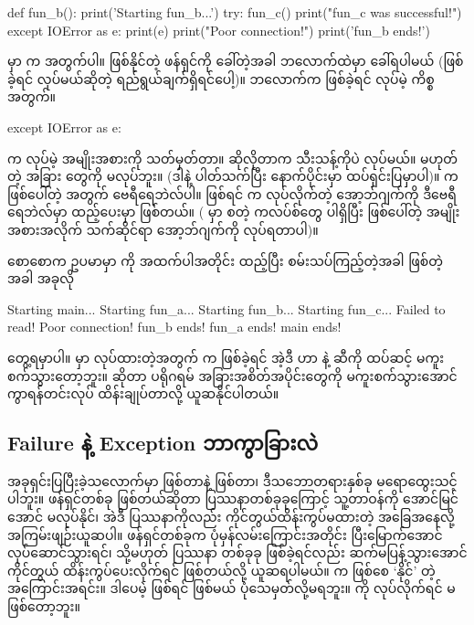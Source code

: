 %
\begin{py}
def fun_b():
    print('Starting fun_b...')
    try:
        fun_c()
        print("fun_c was successful!")
    except IOError as e:
        print(e)
        print("Poor connection!")
    print('fun_b ends!')
\end{py}
%
 မှာ  က  အတွက်ပါ။  ဖြစ်နိုင်တဲ့ ဖန်ရှင်ကို ခေါ်တဲ့အခါ  ဘလောက်ထဲမှာ ခေါ်ရပါမယ် (ဖြစ်ခဲ့ရင်  လုပ်မယ်ဆိုတဲ့ ရည်ရွယ်ချက်ရှိရင်ပေါ့)။  ဘလောက်က  ဖြစ်ခဲ့ရင်  လုပ်မဲ့ ကိစ္စအတွက်။

%
\begin{py}
except IOError as e:
\end{py}
%
 က  လုပ်မဲ့  အမျိုးအစားကို သတ်မှတ်တာ။ ဆိုလိုတာက  သီးသန့်ကိုပဲ  လုပ်မယ်။  မဟုတ်တဲ့ အခြား  တွေကို  မလုပ်ဘူး။ (ဒါနဲ့ ပါတ်သက်ပြီး နောက်ပိုင်းမှာ ထပ်ရှင်းပြမှာပါ)။  က ဖြစ်ပေါ်တဲ့   အတွက် ဗေရီရေဘဲလ်ပါ။  ဖြစ်ရင်  က  လုပ်လိုက်တဲ့  အော့ဘ်ဂျက်ကို ဒီဗေရီရေဘဲလ်မှာ ထည့်ပေးမှာ ဖြစ်တယ်။ ( မှာ \fEn{,} \fEn{,}  စတဲ့ ကလပ်စ်တွေ ပါရှိပြီး ဖြစ်ပေါ်တဲ့  အမျိုးအစားအလိုက် သက်ဆိုင်ရာ  အော့ဘ်ဂျက်ကို  လုပ်ရတာပါ)။

စောစောက ဥပမာမှာ  ကို အထက်ပါအတိုင်း   ထည့်ပြီး စမ်းသပ်ကြည့်တဲ့အခါ  ဖြစ်တဲ့အခါ အခုလို
\begin{codetxt}
Starting main...
Starting fun_a...
Starting fun_b...
Starting fun_c...
Failed to read!
Poor connection!
fun_b ends!
fun_a ends!
main ends!
\end{codetxt}
တွေ့ရမှာပါ။  မှာ  လုပ်ထားတဲ့အတွက်   က  ဖြစ်ခဲ့ရင် အဲ့ဒီ  ဟာ  နဲ့  ဆီကို ထပ်ဆင့် မကူးစက်သွားတော့ဘူး။  ဆိုတာ ပရိုဂရမ် အခြားအစိတ်အပိုင်းတွေကို  မကူးစက်သွားအောင် ကွာရန်တင်းလုပ် ထိန်းချုပ်တာလို့ ယူဆနိုင်ပါတယ်။ 

\subsection*{Failure နဲ့ Exception ဘာကွာခြားလဲ}
အခုရှင်းပြပြီးခဲ့သလောက်မှာ  ဖြစ်တာနဲ့  ဖြစ်တာ၊ ဒီသဘောတရားနှစ်ခု မရောထွေးသင့်ပါဘူး။ ဖန်ရှင်တစ်ခု  ဖြစ်တယ်ဆိုတာ ပြဿနာတစ်ခုခုကြောင့် သူ့တာဝန်ကို အောင်မြင်အောင် မလုပ်နိုင်၊ အဲဒီ ပြဿနာကိုလည်း ကိုင်တွယ်ထိန်းကွပ်မထားတဲ့ အခြေအနေလို့ အကြမ်းဖျဉ်းယူဆပါ။ ဖန်ရှင်တစ်ခုက ပုံမှန်လမ်းကြောင်းအတိုင်း ပြီးမြောက်အောင် လုပ်ဆောင်သွားရင်၊ သို့မဟုတ် ပြဿနာ တစ်ခုခု ဖြစ်ခဲ့ရင်လည်း ဆက်မပြန့်သွားအောင် ကိုင်တွယ် ထိန်းကွပ်ပေးလိုက်ရင်   ဖြစ်တယ်လို့ ယူဆရပါမယ်။  က  ဖြစ်စေ ‘နိုင်’ တဲ့ အကြောင်းအရင်း။ ဒါပေမဲ့  ဖြစ်ရင်  ဖြစ်မယ် ပုံသေမှတ်လို့မရဘူး။   ကို  လုပ်လိုက်ရင်  မဖြစ်တော့ဘူး။

